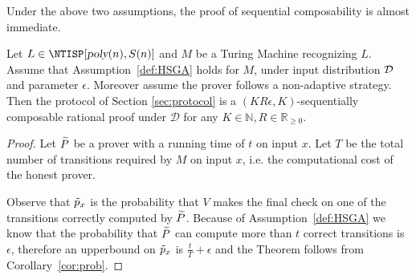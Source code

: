 \medskip
{}
Under the above two assumptions, the proof of sequential composability is almost 
immediate. 

\begin{theorem}
Let $L \in \NTISP[\poly(n), S(n)]$ and $M$ be a Turing Machine recognizing $L$. Assume that  Assumption~\ref{def:HSGA} holds for $M$, under input distribution 
$\cal D$ and parameter $\epsilon$. Moreover assume the prover follows a non-adaptive strategy. Then the protocol of Section  \ref{sec:protocol} is a $(KR\epsilon, K)$-sequentially composable rational proof under $\mathcal{D}$ for any $K \in \mathbb{N}, R \in \mathbb{R}_{\geq 0}$.  
\end{theorem}
\begin{proof}
Let $\widetilde{P}$ be a prover with a running time of $t$ on input $x$.
Let $T$ be the total number of transitions required by $M$ on input $x$, i.e. the 
computational cost of the honest prover.

Observe that $\tilde{p}_x$ is the probability that $V$ makes the final check on one of the transitions correctly computed by $\widetilde{P}$. 
Because of Assumption~\ref{def:HSGA} we know that the probability that $\widetilde{P}$ can 
compute more than $t$ correct transitions is $\epsilon$, therefore an upperbound on 
$\tilde{p}_x$ is $\frac{t}{T}+\epsilon$ and the Theorem follows from Corollary~\ref{cor:prob}. 
\end{proof}